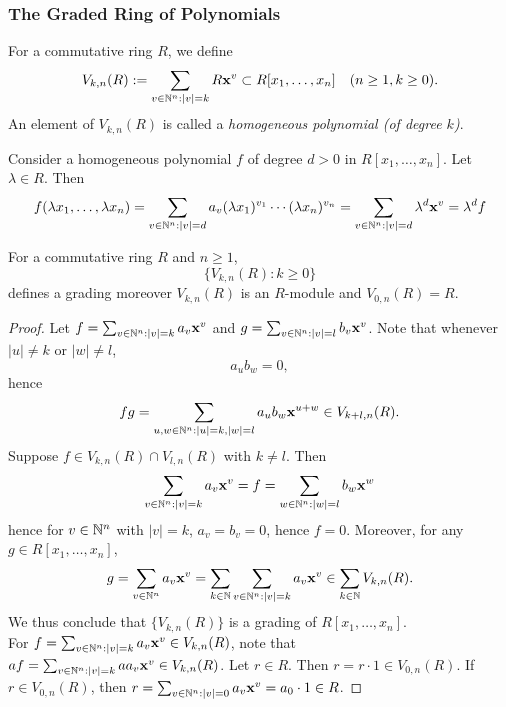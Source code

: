 \subsubsection{The Graded Ring of Polynomials}
    \begin{definition}
        For a commutative ring $R$, we define 
        $$
            V_{k,n}(R) := \sum_{v\in \mathbb{N}^n: \vert v\vert = k} R\mathbf{x}^{v}\subset R[x_1,\dots,x_n]\quad (n\geq 1, k\geq 0).
        $$
        An element of $V_{k,n}(R)$ is called a \emph{homogeneous polynomial (of degree $k$)}. 
    \end{definition}
    \begin{remark}
        Consider a homogeneous polynomial $f$ of degree $d>0$ in $R[x_1,\dots,x_n]$. Let $\lambda\in R$. Then 
        $$
            f(\lambda x_1,\dots,\lambda x_n) = \sum_{v\in\mathbb{N}^n: \vert v\vert =d} a_v(\lambda x_1)^{v_1}\cdots (\lambda x_n)^{v_n} = \sum_{v\in\mathbb{N}^n: \vert v\vert =d} \lambda^d\mathbf{x}^v = \lambda^d f
        $$
    \end{remark}
    \begin{lemma}
        For a commutative ring $R$ and $n\geq 1$, 
        $$
            \{V_{k,n}(R): k\geq 0\}
        $$
        defines a grading moreover $V_{k,n}(R)$ is an $R$-module and $V_{0,n}(R)=R$.
    \end{lemma}
    \begin{proof}
        Let $f=\sum_{v\in \mathbb{N}^n: \vert v\vert = k} a_v \mathbf{x}^v$ and $g=\sum_{v\in \mathbb{N}^n: \vert v\vert = l} b_v\mathbf{x}^v$. Note that whenever $\vert u\vert \neq k$ or $\vert w \vert \neq l$, 
        $$
            a_ub_w=0,
        $$
        hence 
        $$
            fg = \sum_{u,w\in \mathbb{N}^n : \vert u\vert = k, \vert w\vert =l} a_ub_w \mathbf{x}^{u+w} \in V_{k+l,n}(R).
        $$
        Suppose $f\in V_{k,n}(R)\cap V_{l,n}(R)$ with $k\neq l$. Then 
        $$
            \sum_{v\in \mathbb{N}^n:\vert v\vert = k} a_v\mathbf{x}^v = f = \sum_{w\in\mathbb{N}^n : \vert w \vert = l} b_w\mathbf{x}^w
        $$
        hence for $v\in \mathbb{N}^n$ with $\vert v\vert = k$, $a_v = b_v = 0$, hence $f=0$. Moreover, for any $g\in R[x_1,\dots,x_n]$,
        $$
            g = \sum_{v\in \mathbb{N}^n} a_v\mathbf{x}^v =\sum_{k\in \mathbb{N}} \sum_{v\in \mathbb{N}^n: \vert v\vert = k} a_v\mathbf{x}^v \in \sum_{k\in\mathbb{N}} V_{k,n}(R).
        $$
        We thus conclude that $\{V_{k,n}(R)\}$ is a grading of $R[x_1,\dots,x_n]$.\\
        For $f= \sum_{v\in\mathbb{N}^n : \vert v \vert = k} a_v\mathbf{x}^v\in V_{k,n}(R)$, note that $af = \sum_{v\in \mathbb{N}^n : \vert v\vert = k} aa_v \mathbf{x}^v\in V_{k,n}(R)$. Let $r\in R$. Then $r = r\cdot 1 \in V_{0,n}(R)$. If $r\in V_{0,n}(R)$, then $r= \sum_{v\in \mathbb{N}^n: \vert v\vert = 0} a_v\mathbf{x}^v = a_0\cdot 1 \in R$. 
    \end{proof}

